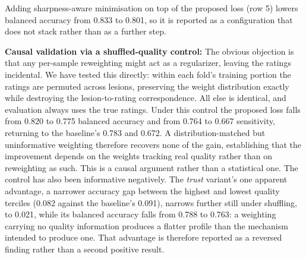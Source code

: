 \documentclass[conference]{IEEEtran}
\begin{document}
Adding sharpness-aware minimisation on top of the proposed loss (row 5) lowers balanced accuracy from 0.833 to 0.801, so it is reported as a configuration that does not stack rather than as a further step.

\textbf{Causal validation via a shuffled-quality control:}
\label{sec:shuffle}
The obvious objection is that any per-sample reweighting might act as a regularizer, leaving the ratings incidental. We have tested this directly: within each fold's training portion the ratings are permuted across lesions, preserving the weight distribution exactly while destroying the lesion-to-rating correspondence. All else is identical, and evaluation always uses the true ratings.
Under this control the proposed loss falls from 0.820 to 0.775 balanced accuracy and from 0.764 to 0.667 sensitivity, returning to the baseline's 0.783 and 0.672. A distribution-matched but uninformative weighting therefore recovers none of the gain, establishing that the improvement depends on the weights tracking real quality rather than on reweighting as such. This is a causal argument rather than a statistical one.
The control has also been informative negatively. The \emph{trust} variant's one apparent advantage, a narrower accuracy gap between the highest and lowest quality terciles (0.082 against the baseline's 0.091), narrows further still under shuffling, to 0.021, while its balanced accuracy falls from 0.788 to 0.763: a weighting carrying no quality information produces a flatter profile than the mechanism intended to produce one. That advantage is therefore reported as a reversed finding rather than a second positive result.
\end{document}
